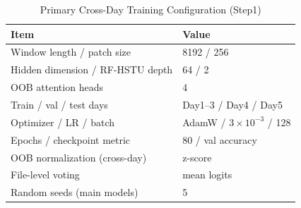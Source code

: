 \begin{table}[!t]
\caption{Primary Cross-Day Training Configuration (Step1)}
\label{tab:hyper}
\centering
\renewcommand{\arraystretch}{1.12}
\begin{tabular}{ll}
\toprule
\textbf{Item} & \textbf{Value} \\
\midrule
Window length / patch size & 8192 / 256 \\
Hidden dimension / RF-HSTU depth & 64 / 2 \\
OOB attention heads & 4 \\
Train / val / test days & Day1--3 / Day4 / Day5 \\
Optimizer / LR / batch & AdamW / $3\times10^{-3}$ / 128 \\
Epochs / checkpoint metric & 80 / val accuracy \\
OOB normalization (cross-day) & z-score \\
File-level voting & mean logits \\
Random seeds (main models) & 5 \\
\bottomrule
\end{tabular}
\end{table}
